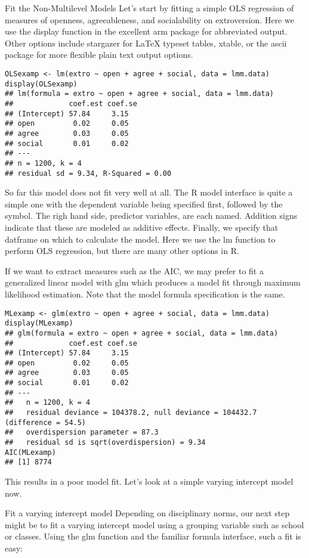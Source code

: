 Fit the Non-Multilevel Models
Let's start by fitting a simple OLS regression of measures of openness, agreeableness, and socialability on extroversion. Here we use the display function in the excellent arm package for abbreviated output. Other options include stargazer for LaTeX typeset tables, xtable, or the ascii package for more flexible plain text output options.
\begin{framed}
\begin{verbatim}
OLSexamp <- lm(extro ~ open + agree + social, data = lmm.data)
display(OLSexamp)
## lm(formula = extro ~ open + agree + social, data = lmm.data)
##             coef.est coef.se
## (Intercept) 57.84     3.15  
## open         0.02     0.05  
## agree        0.03     0.05  
## social       0.01     0.02  
## ---
## n = 1200, k = 4
## residual sd = 9.34, R-Squared = 0.00
\end{verbatim}
\end{framed}
So far this model does not fit very well at all. The R model interface is quite a simple one with the dependent variable being specified first, followed by the ~ symbol. The righ hand side, predictor variables, are each named. Addition signs indicate that these are modeled as additive effects. Finally, we specify that datframe on which to calculate the model. Here we use the lm function to perform OLS regression, but there are many other options in R.

If we want to extract measures such as the AIC, we may prefer to fit a generalized linear model with glm which produces a model fit through maximum likelihood estimation. Note that the model formula specification is the same.
\begin{framed}
\begin{verbatim}
MLexamp <- glm(extro ~ open + agree + social, data = lmm.data)
display(MLexamp)
## glm(formula = extro ~ open + agree + social, data = lmm.data)
##             coef.est coef.se
## (Intercept) 57.84     3.15  
## open         0.02     0.05  
## agree        0.03     0.05  
## social       0.01     0.02  
## ---
##   n = 1200, k = 4
##   residual deviance = 104378.2, null deviance = 104432.7 (difference = 54.5)
##   overdispersion parameter = 87.3
##   residual sd is sqrt(overdispersion) = 9.34
AIC(MLexamp)
## [1] 8774
\end{verbatim}
\end{framed}
This results in a poor model fit. Let's look at a simple varying intercept model now.

Fit a varying intercept model
Depending on disciplinary norms, our next step might be to fit a varying intercept model using a grouping variable such as school or classes. Using the glm function and the familiar formula interface, such a fit is easy:

